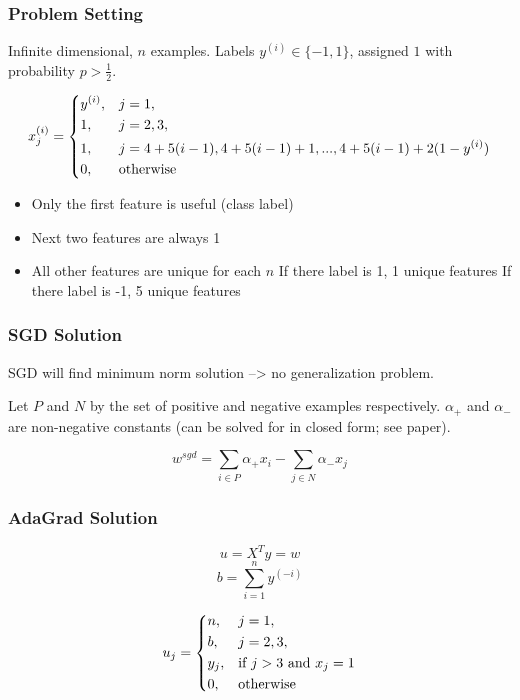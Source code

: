 \documentclass[12pt]{article}
\begin{document}
\subsubsection{Problem Setting}
Infinite dimensional, $n$ examples. Labels $y^{(i)} \in \{-1, 1\}$, assigned $1$ with probability $p > \frac{1}{2}$.

\begin{equation}
  \begin{split}
   x^{(i)}_j &=
    \begin{dcases}
      y^{(i)},& j = 1, \\
      1, & j = 2, 3, \\
      1, & j = 4 + 5(i - 1), 4 + 5(i - 1) + 1, ..., 4 + 5(i - 1) + 2(1-y^{(i)}) \\
      0, & \text{otherwise}
    \end{dcases}\\
  \end{split}
\end{equation}

\begin{itemize}
	\item Only the first feature is useful (class label)
	\item Next two features are always 1
	\item All other features are unique for each $n$
		\subitem If there label is 1, 1 unique features
		\subitem If there label is -1, 5 unique features
\end{itemize}

\subsubsection{SGD Solution}

SGD will find minimum norm solution --> no generalization problem.

Let $P$ and $N$ by the set of positive and negative examples respectively. 
$\alpha_+$ and $\alpha_-$ are non-negative constants (can be solved for in closed form; see paper).

$$w^{sgd} = \sum_{i \in P} \alpha_+ x_i - \sum_{j \in N} \alpha_- x_j$$

\subsubsection{AdaGrad Solution}

$$u = X^T y = w$$
$$b = \sum_{i=1}^n y^{(-i)}$$

\begin{equation}
  \begin{split}
   u_j &=
    \begin{dcases}
      n,& j = 1, \\
      b, & j = 2, 3, \\
      y_j, & \text{if } j > 3 \text{ and } x_j = 1 \\
      0, & \text{otherwise}
    \end{dcases}\\
  \end{split}
\end{equation}
\end{document}

